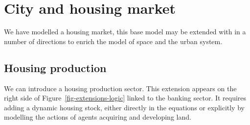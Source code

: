 








\section{City and housing market}

We have modelled a housing market, this base model may be extended with in a number of directions to enrich the  model of space and the urban system.

\subsection{Housing production}

We can introduce a housing production sector. This extension appears on the right side of Figure~\ref{fig-extensions-logic} linked to the banking sector. It requires adding a dynamic housing stock, either directly in the equations or explicitly by modelling the actions of agents acquiring and developing land. %

